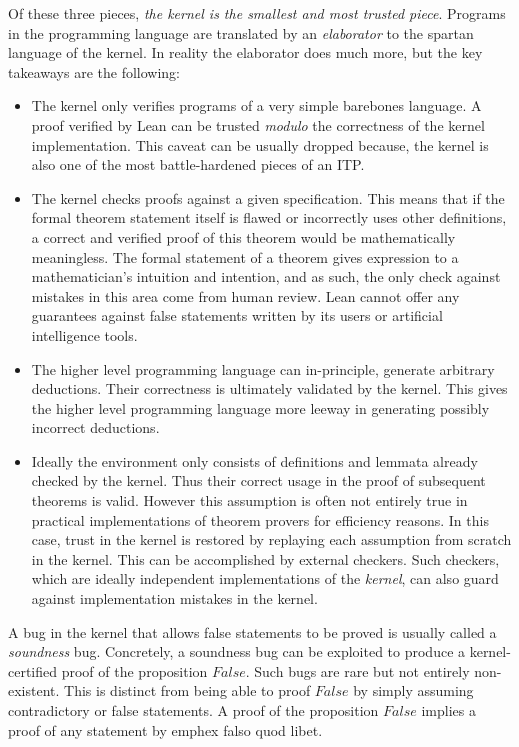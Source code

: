 Of these three pieces, \emph{the kernel is the smallest and most trusted piece}. Programs in the programming language are translated by an \emph{elaborator} to the spartan language of the kernel. In reality the elaborator does much more, but the key takeaways are the following:
\begin{itemize}
    \item The kernel only verifies programs of a very simple barebones language. A proof verified by Lean can be trusted \emph{modulo} the correctness of the kernel implementation. This caveat can be usually dropped because, the kernel is also one of the most battle-hardened pieces of an ITP.
    \item The kernel checks proofs against a given specification. This means that if the formal theorem statement itself is flawed or incorrectly uses other definitions, a correct and verified proof of this theorem would be mathematically meaningless. The formal statement of a theorem gives expression to a mathematician's intuition and intention, and as such, the only check against mistakes in this area come from human review. Lean cannot offer any guarantees against false statements written by its users or artificial intelligence tools.
    \item The higher level programming language can in-principle, generate arbitrary deductions. Their correctness is ultimately validated by the kernel. This gives the higher level programming language more leeway in generating possibly incorrect deductions.
    \item Ideally the environment only consists of definitions and lemmata already checked by the kernel. Thus their correct usage in the proof of subsequent theorems is valid. However this assumption is often not entirely true in practical implementations of theorem provers for efficiency reasons. In this case, trust in the kernel is restored by replaying each assumption from scratch in the kernel. This can be accomplished by external checkers. Such checkers, which are ideally independent implementations of the \emph{kernel}, can also guard against implementation mistakes in the kernel.
\end{itemize}

\begin{remark}
    A bug in the kernel that allows false statements to be proved is usually called a \emph{soundness} bug. Concretely, a soundness bug can be exploited to produce a kernel-certified proof of the proposition $False$. Such bugs are rare but not entirely non-existent. This is distinct from being able to proof $False$ by simply assuming contradictory or false statements. A proof of the proposition $False$ implies a proof of any statement by emph{ex falso quod libet}.
\end{remark}

